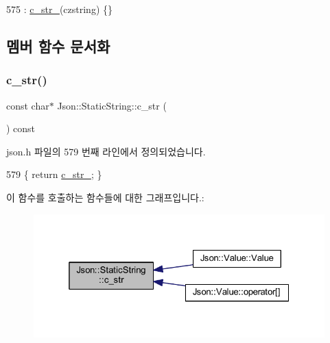 \begin{DoxyCode}
575 : \hyperlink{class_json_1_1_static_string_a9f0d9e8caee8f8db14e2c8c24760dffd}{c\_str\_}(czstring) \{\}
\end{DoxyCode}


\subsection{멤버 함수 문서화}
\mbox{\label{class_json_1_1_static_string_ad6be703d432d108623bb0aa06b0b90ca}} 
\subsubsection{\texorpdfstring{c\+\_\+str()}{c\_str()}}
{\footnotesize\ttfamily const char$\ast$ Json\+::\+Static\+String\+::c\+\_\+str (\begin{DoxyParamCaption}{ }\end{DoxyParamCaption}) const\hspace{0.3cm}{\ttfamily [inline]}}



json.\+h 파일의 579 번째 라인에서 정의되었습니다.


\begin{DoxyCode}
579 \{ \textcolor{keywordflow}{return} \hyperlink{class_json_1_1_static_string_a9f0d9e8caee8f8db14e2c8c24760dffd}{c\_str\_}; \}
\end{DoxyCode}
이 함수를 호출하는 함수들에 대한 그래프입니다.\+:\nopagebreak
\begin{figure}[H]
\begin{center}
\leavevmode
\includegraphics[width=325pt]{class_json_1_1_static_string_ad6be703d432d108623bb0aa06b0b90ca_icgraph}
\end{center}
\end{figure}
\mbox{\label{class_json_1_1_static_string_a256a6cc0c630aef670848a0f11707b62}} 
